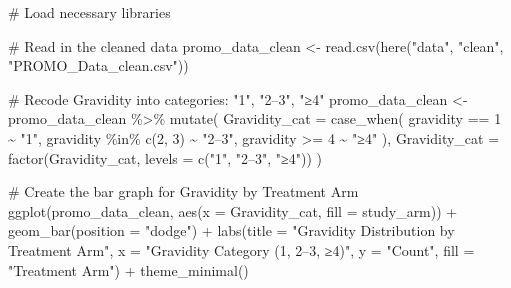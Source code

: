 \documentclass[
  letterpaper,
  DIV=11,
  numbers=noendperiod]{scrartcl}
\newenvironment{Shaded}{}{}
\newcommand{\AttributeTok}[1]{\textcolor[rgb]{0.84,0.23,0.29}{#1}}
\newcommand{\CommentTok}[1]{\textcolor[rgb]{0.42,0.45,0.49}{#1}}
\newcommand{\DecValTok}[1]{\textcolor[rgb]{0.00,0.36,0.77}{#1}}
\newcommand{\FunctionTok}[1]{\textcolor[rgb]{0.44,0.26,0.76}{#1}}
\newcommand{\NormalTok}[1]{\textcolor[rgb]{0.14,0.16,0.18}{#1}}
\newcommand{\OtherTok}[1]{\textcolor[rgb]{0.44,0.26,0.76}{#1}}
\newcommand{\SpecialCharTok}[1]{\textcolor[rgb]{0.00,0.36,0.77}{#1}}
\newcommand{\StringTok}[1]{\textcolor[rgb]{0.01,0.18,0.38}{#1}}
\begin{document}
\begin{Shaded}
\begin{Highlighting}[]
\CommentTok{\# Load necessary libraries}

\CommentTok{\# Read in the cleaned data}
\NormalTok{promo\_data\_clean }\OtherTok{\textless{}{-}} \FunctionTok{read.csv}\NormalTok{(}\FunctionTok{here}\NormalTok{(}\StringTok{"data"}\NormalTok{, }\StringTok{"clean"}\NormalTok{, }\StringTok{"PROMO\_Data\_clean.csv"}\NormalTok{))}

\CommentTok{\# Recode Gravidity into categories: "1", "2–3", "≥4"}
\NormalTok{promo\_data\_clean }\OtherTok{\textless{}{-}}\NormalTok{ promo\_data\_clean }\SpecialCharTok{\%\textgreater{}\%}
  \FunctionTok{mutate}\NormalTok{(}
    \AttributeTok{Gravidity\_cat =} \FunctionTok{case\_when}\NormalTok{(}
\NormalTok{      gravidity }\SpecialCharTok{==} \DecValTok{1} \SpecialCharTok{\textasciitilde{}} \StringTok{"1"}\NormalTok{,}
\NormalTok{      gravidity }\SpecialCharTok{\%in\%} \FunctionTok{c}\NormalTok{(}\DecValTok{2}\NormalTok{, }\DecValTok{3}\NormalTok{) }\SpecialCharTok{\textasciitilde{}} \StringTok{"2–3"}\NormalTok{,}
\NormalTok{      gravidity }\SpecialCharTok{\textgreater{}=} \DecValTok{4} \SpecialCharTok{\textasciitilde{}} \StringTok{"≥4"}
\NormalTok{    ),}
    \AttributeTok{Gravidity\_cat =} \FunctionTok{factor}\NormalTok{(Gravidity\_cat, }\AttributeTok{levels =} \FunctionTok{c}\NormalTok{(}\StringTok{"1"}\NormalTok{, }\StringTok{"2–3"}\NormalTok{, }\StringTok{"≥4"}\NormalTok{))}
\NormalTok{  )}

\CommentTok{\# Create the bar graph for Gravidity by Treatment Arm}
\FunctionTok{ggplot}\NormalTok{(promo\_data\_clean, }\FunctionTok{aes}\NormalTok{(}\AttributeTok{x =}\NormalTok{ Gravidity\_cat, }\AttributeTok{fill =}\NormalTok{ study\_arm)) }\SpecialCharTok{+}
  \FunctionTok{geom\_bar}\NormalTok{(}\AttributeTok{position =} \StringTok{"dodge"}\NormalTok{) }\SpecialCharTok{+}
  \FunctionTok{labs}\NormalTok{(}\AttributeTok{title =} \StringTok{"Gravidity Distribution by Treatment Arm"}\NormalTok{,}
       \AttributeTok{x =} \StringTok{"Gravidity Category (1, 2–3, ≥4)"}\NormalTok{,}
       \AttributeTok{y =} \StringTok{"Count"}\NormalTok{,}
       \AttributeTok{fill =} \StringTok{"Treatment Arm"}\NormalTok{) }\SpecialCharTok{+}
  \FunctionTok{theme\_minimal}\NormalTok{()}
\end{Highlighting}
\end{Shaded}
\end{document}
